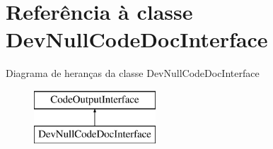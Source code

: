 \hypertarget{class_dev_null_code_doc_interface}{\section{Referência à classe Dev\-Null\-Code\-Doc\-Interface}
\label{class_dev_null_code_doc_interface}
}
Diagrama de heranças da classe Dev\-Null\-Code\-Doc\-Interface\begin{figure}[H]
\begin{center}
\leavevmode
\includegraphics[height=2.000000cm]{class_dev_null_code_doc_interface}
\end{center}
\end{figure}
